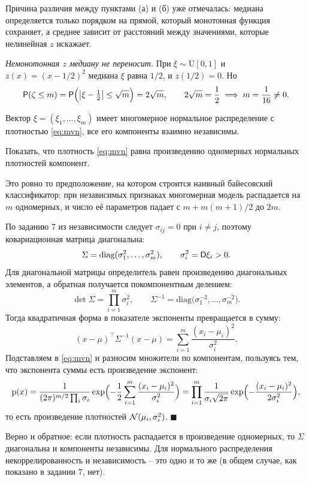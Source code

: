 \documentclass[12pt,a4paper]{article}
\begin{document}
Причина различия между пунктами (а) и (б) уже отмечалась: медиана определяется
только порядком на прямой, который монотонная функция сохраняет, а среднее
зависит от расстояний между значениями, которые нелинейная $z$ искажает.

\emph{Немонотонная $z$ медиану не переносит.} При $\xi \sim \mathrm{U}[0,1]$ и
$z(x) = (x - 1/2)^2$ медиана $\xi$ равна $1/2$, и $z(1/2) = 0$. Но
\[
  \mathsf{P}(\zeta \le m) = \mathsf{P}\Bigl(\left\lvert \xi - \tfrac12 \right\rvert \le \sqrt m\Bigr) = 2\sqrt m,
  \qquad
  2\sqrt m = \frac12 \;\Longrightarrow\; m = \frac{1}{16} \ne 0 .
\]

\dano Вектор $\xi = (\xi_1,\dots,\xi_m)$ имеет многомерное нормальное
распределение с плотностью \eqref{eq:mvn}, все его компоненты взаимно
независимы.

\treb Показать, что плотность \eqref{eq:mvn} равна произведению одномерных
нормальных плотностей компонент.

\zachem Это ровно то предположение, на котором строится наивный байесовский
классификатор: при независимых признаках многомерная модель распадается на
$m$ одномерных, и число её параметров падает с $m + m(m+1)/2$ до $2m$.

\resh По заданию 7 из независимости следует $\sigma_{ij} = 0$ при $i \ne j$,
поэтому ковариационная матрица диагональна:
\[
  \Sigma = \mathrm{diag}(\sigma_1^2,\dots,\sigma_m^2),
  \qquad \sigma_i^2 = \mathsf{D}\xi_i > 0 .
\]
Для диагональной матрицы определитель равен произведению диагональных элементов,
а обратная получается покомпонентным делением:
\[
  \det\Sigma = \prod_{i=1}^{m}\sigma_i^2,
  \qquad
  \Sigma^{-1} = \mathrm{diag}\bigl(\sigma_1^{-2},\dots,\sigma_m^{-2}\bigr).
\]
Тогда квадратичная форма в показателе экспоненты превращается в сумму:
\[
  (x-\mu)^{\top}\Sigma^{-1}(x-\mu) = \sum_{i=1}^{m}\frac{(x_i-\mu_i)^2}{\sigma_i^2}.
\]
Подставляем в \eqref{eq:mvn} и разносим множители по компонентам, пользуясь тем,
что экспонента суммы есть произведение экспонент:
\[
  \mathrm{p}(x)
  = \frac{1}{(2\pi)^{m/2}\prod_i\sigma_i}
    \exp\Bigl(-\frac12\sum_{i=1}^{m}\frac{(x_i-\mu_i)^2}{\sigma_i^2}\Bigr)
  = \prod_{i=1}^{m}\frac{1}{\sigma_i\sqrt{2\pi}}
    \exp\Bigl(-\frac{(x_i-\mu_i)^2}{2\sigma_i^2}\Bigr),
\]
то есть произведение плотностей $\mathcal{N}(\mu_i,\sigma_i^2)$. $\blacksquare$

Верно и обратное: если плотность распадается в произведение одномерных, то
$\Sigma$ диагональна и компоненты независимы. Для нормального распределения
некоррелированность и независимость -- это одно и то же (в общем случае, как
показано в задании 7, нет).
\end{document}
